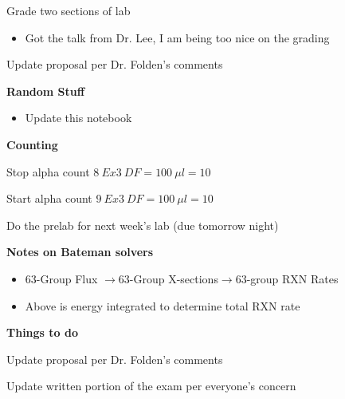 \documentclass[idxtotoc,hyperref,openany,oneside]{labbook} %
\newcommand{\cmark}{\ding{51}}%
\newcommand{\done}{\rlap{$\square$}{\raisebox{2pt}{\large\hspace{1pt}\cmark}}%
  \hspace{-2.5pt}}
\begin{document}
\begin{todolist}
\item[\done]{Grade two sections of lab}
  \begin{itemize}
  \item{Got the talk from Dr. Lee, I am being too nice on the grading}
  \end{itemize}
\end{todolist}


\begin{todolist}
\item{Update proposal per Dr. Folden's comments}
\end{todolist}





\textbf{Random Stuff}
\begin{itemize}
\item{Update this notebook}
\end{itemize}


\textbf{Counting}
\begin{todolist}
\item[\done]{Stop alpha count $\boxed{8\ Ex3\ DF=100\ \mu l=10}$}
\item[\done]{Start alpha count $\boxed{9\ Ex3\ DF=100\ \mu l=10}$}
\end{todolist}

\begin{todolist}
\item{Do the prelab for next week's lab (due tomorrow night)}
\end{todolist}


\textbf{Notes on Bateman solvers}
\begin{itemize}
\item{63-Group Flux $\rightarrow$63-Group X-sections$\rightarrow$63-group RXN Rates}
\item{Above is energy integrated to determine total RXN rate}
\end{itemize}
\textbf{Things to do}
\begin{todolist}
\item{Update proposal per Dr. Folden's comments}
\item{Update written portion of the exam per everyone's concern}
\end{todolist}
\end{document}
